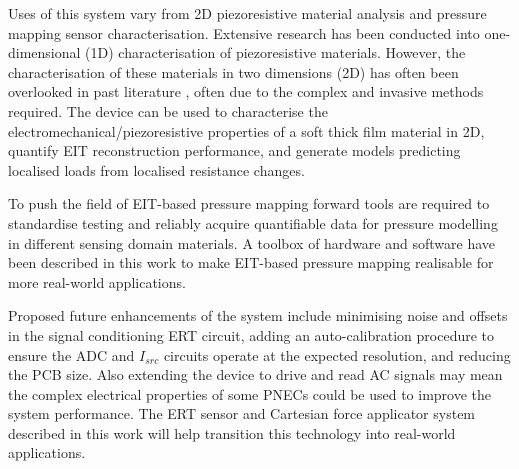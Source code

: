 Uses of this system vary from 2D piezoresistive material analysis and pressure mapping sensor characterisation. Extensive research has been conducted into one-dimensional (1D) characterisation of piezoresistive materials. However, the characterisation of these materials in two dimensions (2D) has often been overlooked in past literature \cite{Ding2007,Shang2016,Buketov2020,Zhao2013}, often due to the complex and invasive methods required. The device can be used to characterise the electromechanical/piezoresistive properties of a soft thick film material in 2D, quantify EIT reconstruction performance, and generate models predicting localised loads from localised resistance changes.

To push the field of EIT-based pressure mapping forward tools are required to standardise testing and reliably acquire quantifiable data for pressure modelling in different sensing domain materials. A toolbox of hardware and software have been described in this work to make EIT-based pressure mapping realisable for more real-world applications.

Proposed future enhancements of the system include minimising noise and offsets in the signal conditioning ERT circuit, adding an auto-calibration procedure to ensure the ADC and $I_{src}$ circuits operate at the expected resolution, and reducing the PCB size. Also extending the device to drive and read AC signals may mean the complex electrical properties of some PNECs could be used to improve the system performance. The ERT sensor and Cartesian force applicator system described in this work will help transition this technology into real-world applications.


